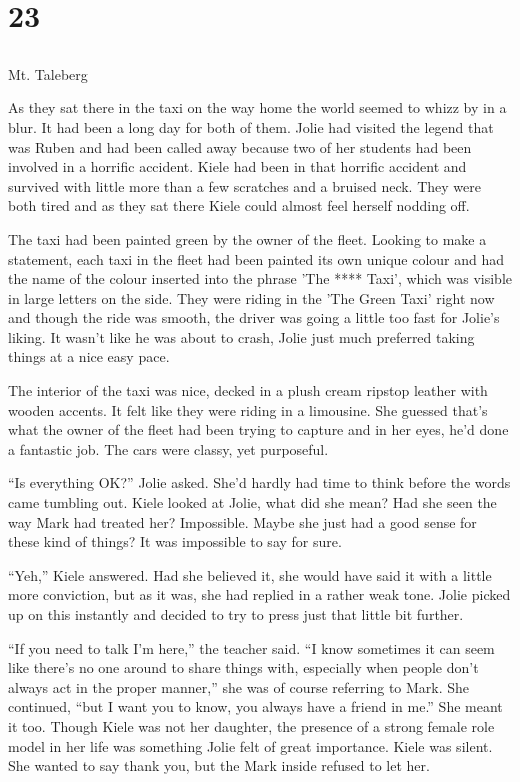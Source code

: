 \chapter{23}
\section{}
Mt. Taleberg  

As they sat there in the taxi on the way home the world seemed to whizz by in a blur.  It had been a long day for both of them.  Jolie had visited the legend that was Ruben and had been called away because two of her students had been involved in a horrific accident.  Kiele had been in that horrific accident and survived with little more than a few scratches and a bruised neck.  They were both tired and as they sat there Kiele could almost feel herself nodding off.  

The taxi had been painted green by the owner of the fleet.  Looking to make a statement, each taxi in the fleet had been painted its own unique colour and had the name of the colour inserted into the phrase 'The **** Taxi', which was visible in large letters on the side.  They were riding in the 'The Green Taxi' right now and though the ride was smooth, the driver was going a little too fast for Jolie's liking.  It wasn't like he was about to crash, Jolie just much preferred taking things at a nice easy pace.  

The interior of the taxi was nice, decked in a plush cream ripstop leather with wooden accents.  It felt like they were riding in a limousine.  She guessed that's what the owner of the fleet had been trying to capture and in her eyes, he'd done a fantastic job.  The cars were classy, yet purposeful.

``Is everything OK?'' Jolie asked.  She'd hardly had time to think before the words came tumbling out.  Kiele looked at Jolie, what did she mean?  Had she seen the way Mark had treated her?  Impossible.  Maybe she just had a good sense for these kind of things?  It was impossible to say for sure.

``Yeh,'' Kiele answered.  Had she believed it, she would have said it with a little more conviction, but as it was, she had replied in a rather weak tone.  Jolie picked up on this instantly and decided to try to press just that little bit further.

``If you need to talk I'm here,'' the teacher said.  ``I know sometimes it can seem like there's no one around to share things with, especially when people don't always act in the proper manner,'' she was of course referring to Mark.  She continued, ``but I want you to know, you always have a friend in me.''  She meant it too.  Though Kiele was not her daughter, the presence of a strong female role model in her life was something Jolie felt of great importance.  Kiele was silent.  She wanted to say thank you, but the Mark inside refused to let her.

